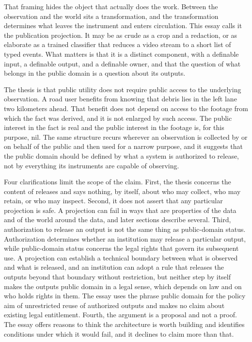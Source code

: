 \documentclass[11pt]{article}
\theoremstyle{definition}
\begin{document}
That framing hides the object that actually does the work. Between the observation and the world sits a transformation, and the transformation determines what leaves the instrument and enters circulation. This essay calls it the publication projection. It may be as crude as a crop and a redaction, or as elaborate as a trained classifier that reduces a video stream to a short list of typed events. What matters is that it is a distinct component, with a definable input, a definable output, and a definable owner, and that the question of what belongs in the public domain is a question about its outputs.

The thesis is that public utility does not require public access to the underlying observation. A road user benefits from knowing that debris lies in the left lane two kilometers ahead. That benefit does not depend on access to the footage from which the fact was derived, and it is not enlarged by such access. The public interest in the fact is real and the public interest in the footage is, for this purpose, nil. The same structure recurs wherever an observation is collected by or on behalf of the public and then used for a narrow purpose, and it suggests that the public domain should be defined by what a system is authorized to release, not by everything its instruments are capable of observing.

Four clarifications limit the scope of the claim. First, the thesis concerns the content of releases and says nothing, by itself, about who may collect, who may retain, or who may inspect. Second, it does not assert that any particular projection is safe. A projection can fail in ways that are properties of the data and of the world around the data, and later sections describe several. Third, authorization to release an output is not the same thing as public-domain status. Authorization determines whether an institution may release a particular output, while public-domain status concerns the legal rights that govern its subsequent use. A projection can establish a technical boundary between what is observed and what is released, and an institution can adopt a rule that releases the outputs beyond that boundary without restriction, but neither step by itself makes the outputs public domain in a legal sense, which depends on law and on who holds rights in them. The essay uses the phrase public domain for the policy aim of unrestricted reuse of authorized outputs and makes no claim about existing legal entitlement. Fourth, the argument is a proposal and not a proof. The essay offers reasons to think the architecture is worth building and identifies conditions under which it would fail, and it declines to claim more than that.
\end{document}

